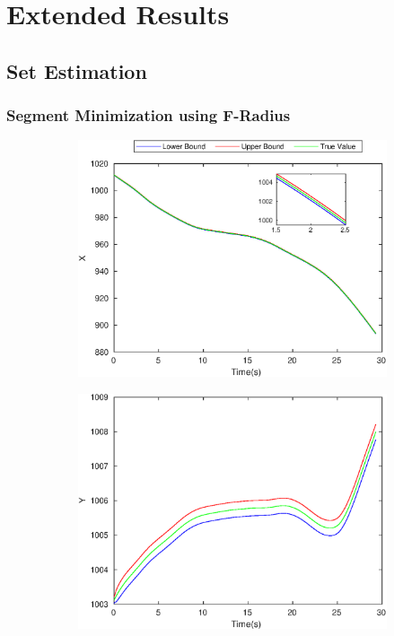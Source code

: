 \chapter{Extended Results} \label{ch:eresult}
\section{Set Estimation}
\FloatBarrier
\subsection{Segment Minimization using F-Radius}
\begin{figure}[!h]
\begin{subfigure}{.5\linewidth}
\centering
\includegraphics[width=\linewidth]{figures/Frad/s3cvSMX}
\end{subfigure}
\begin{subfigure}{.5\linewidth}
\centering
\includegraphics[width=\linewidth]{figures/Frad/s3cvSMY}

\end{subfigure}
\end{figure}
